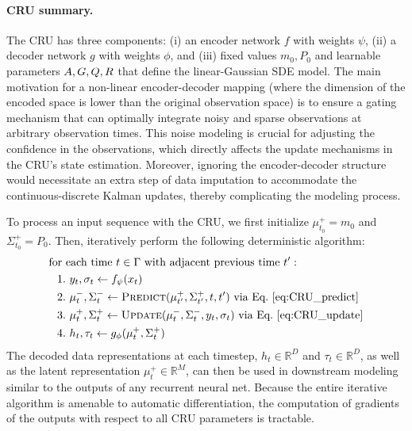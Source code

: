 \paragraph{CRU summary.}
The CRU has three components: (i) an encoder network $f$ with weights $\psi$, (ii) a decoder network $g$ with weights $\phi$,  and (iii) fixed values $m_0, P_0$ and learnable parameters $A, G, Q, R$ that define the linear-Gaussian SDE model. The main motivation for a non-linear encoder-decoder mapping (where the dimension of the encoded space is lower than the original observation space) is to ensure a gating mechanism that can optimally integrate noisy and sparse observations at arbitrary observation times. This noise modeling is crucial for adjusting the confidence in the observations, which directly affects the update mechanisms in the CRU's state estimation. Moreover, ignoring the encoder-decoder structure would necessitate an extra step of data imputation to accommodate the continuous-discrete Kalman updates, thereby complicating the modeling process.

To process an input sequence with the CRU, we first initialize $\mu^+_{t_0} = m_0$ and $\Sigma^+_{t_0} = P_0$.
Then, iteratively perform the following deterministic algorithm:
\begin{align}
\label{eq:CRU_algorithm}
\text{for~} &\text{each time}~ t \in \Gamma \text{~with adjacent previous time~$t'$}: 
\notag \\
    1.&~ y_t, \sigma_t \gets f_{\psi}( x_t)
    \\ \notag
    2.&~ \mu_t^-, \Sigma_t^- \gets \textsc{Predict}( \mu^{+}_{t'}, \Sigma^{+}_{t'}, t, t') 
    ~\text{via Eq.}~\eqref{eq:CRU_predict}
    \\ \notag 
    3.&~ \mu_t^+, \Sigma_t^+ \gets \textsc{Update}( \mu_t^-, \Sigma_t^-, y_t, \sigma_t )
    ~\text{via Eq.}~\eqref{eq:CRU_update}
    \\ \notag 
    4.&~ h_t, \tau_t \gets g_{\phi}( \mu_t^+, \Sigma_t^+ )
    \notag 
\end{align}
The decoded data representations at each timestep, $h_t \in \mathbb{R}^D$ and $\tau_t \in \mathbb{R}^D$, as well as the latent representation $\mu^+_t \in \mathbb{R}^M$, can then be used in downstream modeling similar to the outputs of any recurrent neural net.
Because the entire iterative algorithm is amenable to automatic differentiation, the computation of gradients of the outputs with respect to all CRU parameters is tractable.

